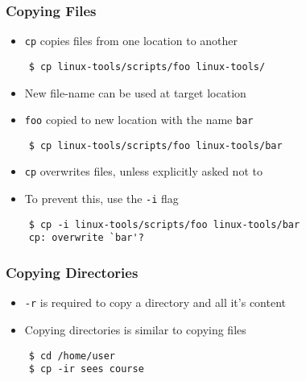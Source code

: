 \documentclass[12pt,compress]{beamer}
\begin{document}
\begin{frame}[fragile]
  \frametitle{Copying Files}

  \begin{itemize}
  \item \texttt{cp} copies files from one location to another
  \end{itemize}

  \begin{lstlisting}
    $ cp linux-tools/scripts/foo linux-tools/
  \end{lstlisting} %

  \begin{itemize}
  \item New file-name can be used at target location
  \item \texttt{foo} copied to new location with the name \texttt{bar} 
  \end{itemize}

  \begin{lstlisting}
    $ cp linux-tools/scripts/foo linux-tools/bar
  \end{lstlisting} %

  \begin{itemize}
  \item \texttt{cp} overwrites files, unless explicitly asked not to
  \item To prevent this, use the \texttt{-i} flag 
  \end{itemize}
  
  \begin{lstlisting}
    $ cp -i linux-tools/scripts/foo linux-tools/bar
    cp: overwrite `bar'?
  \end{lstlisting} %
\end{frame}

\begin{frame}[fragile]
  \frametitle{Copying Directories}

  \begin{itemize}
  \item \texttt{-r} is required to copy a directory and all it's
    content
  \item Copying directories is similar to copying files
  \end{itemize}

  \begin{lstlisting}
    $ cd /home/user
    $ cp -ir sees course
  \end{lstlisting}
\end{frame}
\end{document}
